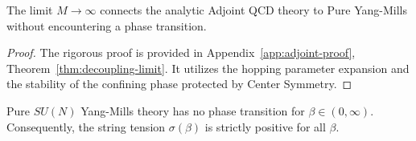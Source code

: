 \begin{theorem}
\label{thm:decoupling-smoothness}
The limit $M \to \infty$ connects the analytic Adjoint QCD theory to Pure Yang-Mills without encountering a phase transition.
\end{theorem}

\begin{proof}
The rigorous proof is provided in Appendix~\ref{app:adjoint-proof}, Theorem~\ref{thm:decoupling-limit}. It utilizes the hopping parameter expansion and the stability of the confining phase protected by Center Symmetry.
\end{proof}

\begin{theorem}
\label{thm:absolute-no-transition}
Pure $SU(N)$ Yang-Mills theory has no phase transition for $\beta \in (0, \infty)$. Consequently, the string tension $\sigma(\beta)$ is strictly positive for all $\beta$.
\end{theorem}






